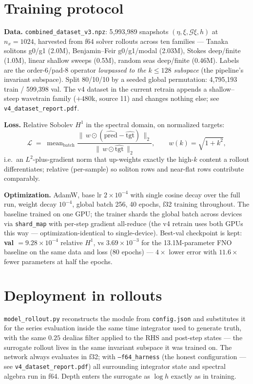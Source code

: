 \documentclass[11pt,letterpaper]{article}
\newcommand{\Gop}{\mathcal{G}}
\begin{document}
\section{Training protocol}

\textbf{Data.} \texttt{combined\_dataset\_v3.npz}: 5{,}993{,}989 snapshots
$(\eta, \xi, \Gop\xi, h)$ at $n_x = 1024$, harvested from f64 solver rollouts
across ten families --- Tanaka solitons g0/g1 (2.0M), Benjamin--Feir g0/g1/modal
(2.03M), Stokes deep/finite (1.0M), linear shallow sweeps (0.5M), random seas
deep/finite (0.46M). Labels are the order-6/pad-8 operator \emph{lowpassed to
the $k\le128$ subspace} (the pipeline's invariant subspace). Split 80/10/10 by a
seeded global permutation: 4{,}795{,}193 train / 599{,}398 val. The v4 dataset in
the current retrain appends a shallow--steep wavetrain family ($+480$k, source
11) and changes nothing else; see \texttt{v4\_dataset\_report.pdf}.

\textbf{Loss.} Relative Sobolev $H^1$ in the spectral domain, on normalized
targets:
\[
\mathcal{L} \;=\; \operatorname{mean}_{\text{batch}}
\frac{\bigl\|\,w \odot (\widehat{\mathrm{pred}} - \widehat{\mathrm{tgt}})\,\bigr\|_2}
     {\bigl\|\,w \odot \widehat{\mathrm{tgt}}\,\bigr\|_2},
\qquad w(k) = \sqrt{1 + k^2},
\]
i.e.\ an $L^2$-plus-gradient norm that up-weights exactly the high-$k$ content a
rollout differentiates; relative (per-sample) so soliton rows and near-flat rows
contribute comparably.

\textbf{Optimization.} AdamW, base lr $2\times10^{-4}$ with single cosine decay
over the full run, weight decay $10^{-4}$, global batch 256, 40 epochs, f32
training throughout. The baseline trained on one GPU; the trainer shards the
global batch across devices via \texttt{shard\_map} with per-step gradient
all-reduce (the v4 retrain uses both GPUs this way --- optimization-identical to
single-device). Best-val checkpoint is kept: \textbf{val $= 9.28\times10^{-4}$}
relative $H^1$, vs $3.69\times10^{-3}$ for the 13.1M-parameter FNO baseline on
the same data and loss (80 epochs) --- $4\times$ lower error with $11.6\times$
fewer parameters at half the epochs.

\section{Deployment in rollouts}

\texttt{model\_rollout.py} reconstructs the module from \texttt{config.json}
and substitutes it for the series evaluation inside the same time integrator
used to generate truth, with the same $0.25$ dealias filter applied to the RHS
and post-step states --- the surrogate rollout lives in the same invariant
subspace it was trained on. The network always evaluates in f32; with
\texttt{--f64\_harness} (the honest configuration --- see
\texttt{v4\_dataset\_report.pdf}) all surrounding integrator state and spectral
algebra run in f64. Depth enters the surrogate as $\log h$ exactly as in
training.
\end{document}
